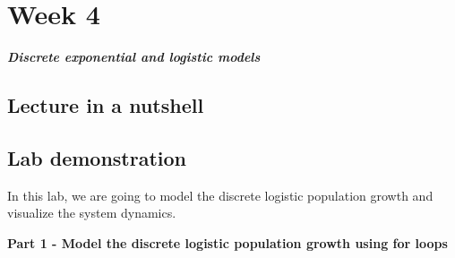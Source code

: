 \documentclass[
]{book}
\begin{document}
\hypertarget{week-4}{%
\chapter*{Week 4}\label{week-4}}

\textbf{\emph{Discrete exponential and logistic models}}

\hypertarget{lecture-in-a-nutshell-3}{%
\section*{Lecture in a nutshell}\label{lecture-in-a-nutshell-3}}

\hypertarget{lab-demonstration-3}{%
\section*{Lab demonstration}\label{lab-demonstration-3}}

In this lab, we are going to model the discrete logistic population growth and visualize the system dynamics.

\textbf{Part 1 - Model the discrete logistic population growth using for loops}
\end{document}
